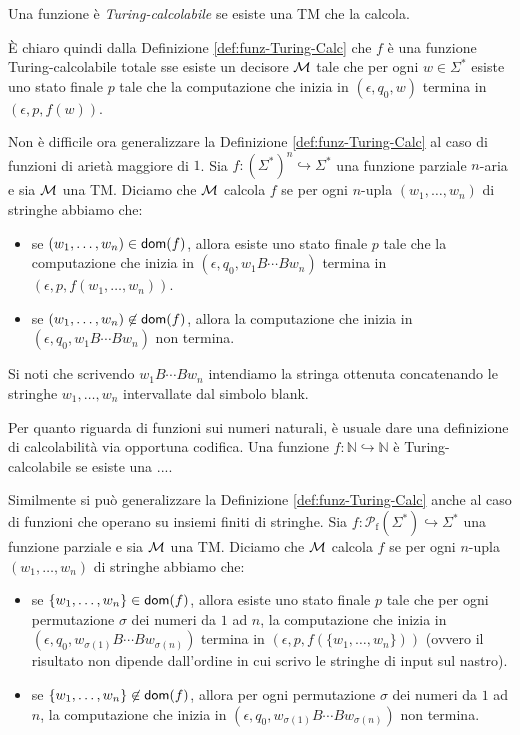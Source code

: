 \documentclass[runningheads,a4paper]{llncs}
\begin{document}
Una funzione \`{e} \emph{Turing-calcolabile} se esiste una TM che la calcola.

\`{E} chiaro quindi dalla Definizione \ref{def:funz-Turing-Calc} che $f$ \`{e} una funzione Turing-calcolabile totale sse esiste un decisore $\mathcal{M}$ tale che per ogni $w \in \Sigma^*$  esiste uno stato finale $p$ tale che la computazione che inizia in $(\epsilon,q_0,w)$ termina in $(\epsilon,p,f(w))$.

Non \`{e} difficile ora generalizzare la Definizione \ref{def:funz-Turing-Calc} al caso di funzioni di ariet\`{a} maggiore di $1$. Sia $f: (\Sigma^*)^n \hookrightarrow \Sigma^*$ una funzione parziale $n$-aria e sia $\mathcal{M}$ una TM. Diciamo che $\mathcal{M}$ calcola $f$ se per ogni $n$-upla $(w_1,\ldots,w_n)$ di stringhe abbiamo che:
\begin{itemize}
\item se $(w_1,\ldots,w_n)\in\mathsf{dom}(f)$, allora esiste uno stato finale $p$ tale che la computazione che inizia in $(\epsilon,q_0,w_1B \cdots B w_n)$ termina in $(\epsilon,p,f(w_1,\ldots,w_n))$.
\item se $(w_1,\ldots,w_n)\not\in\mathsf{dom}(f)$, allora la computazione che inizia in $(\epsilon,q_0,w_1B \cdots B w_n)$ non termina.
\end{itemize}
Si noti che scrivendo $w_1B \cdots B w_n$ intendiamo la stringa ottenuta concatenando le stringhe $w_1,\ldots,w_n$ intervallate dal simbolo blank.

Per quanto riguarda di funzioni sui numeri naturali, \`{e} usuale dare una definizione di calcolabilit\`{a} via opportuna codifica.
 Una funzione $f: \mathbb{N} \hookrightarrow \mathbb{N}$ \`{e} Turing-calcolabile se esiste una ....

Similmente si pu\`{o} generalizzare la Definizione \ref{def:funz-Turing-Calc} anche al caso di funzioni che operano su insiemi finiti di stringhe. Sia $f: \mathcal{P}_{\mathrm{f}}(\Sigma^*) \hookrightarrow \Sigma^*$ una funzione parziale e sia $\mathcal{M}$ una TM. Diciamo che $\mathcal{M}$ calcola $f$ se per ogni $n$-upla $(w_1,\ldots,w_n)$ di stringhe abbiamo che:
\begin{itemize}
\item se $\{w_1,\ldots,w_n\}\in\mathsf{dom}(f)$, allora esiste uno stato finale $p$ tale che per ogni permutazione $\sigma$ dei numeri da $1$ ad $n$, la computazione che inizia in $(\epsilon,q_0,w_{\sigma(1)}B \cdots B w_{\sigma(n)})$ termina in $(\epsilon,p,f(\{w_1,\ldots,w_n\}))$ (ovvero il risultato non dipende dall'ordine in cui scrivo le stringhe di input sul nastro). 
\item se $\{w_1,\ldots,w_n\}\not\in\mathsf{dom}(f)$, allora per ogni permutazione $\sigma$ dei numeri da $1$ ad $n$, la computazione che inizia in $(\epsilon,q_0,w_{\sigma(1)}B \cdots B w_{\sigma(n)})$ non termina.
\end{itemize}
\end{document}
